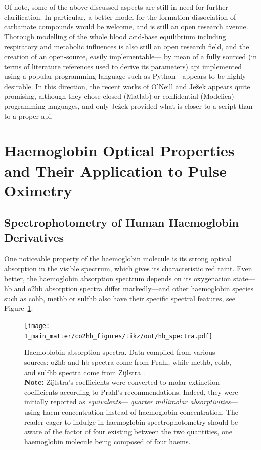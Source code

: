 \mfrin{}Of note, some of the above-discussed aspects are still in need for further clarification. In particular, a better model for the formation-dissociation of carbamate compounds would be welcome, and is still an open research avenue\cite{blake2022}. Thorough modelling of the whole blood acid-base equilibrium including respiratory and metabolic influences is also still an open research field, and the creation of an open-source, easily implementable---\ie{} by mean of a fully sourced (in terms of literature references used to derive its parameters) \gls{api} implemented using a popular programming language such as Python---appears to be highly desirable. In this direction, the recent works of O'Neill and Ježek appears quite promising\cite{oneill2017, jezek2018}, although they chose closed (Matlab) or confidential (Modelica) programming languages, and only Ježek provided what is closer to a script than to a proper \gls{api}.

\section[Hb. Optical Prop. and Their App. to Pulse Oximetry]{Haemoglobin Optical Properties and Their Application to Pulse Oximetry}

\subsection{Spectrophotometry of Human Haemoglobin Derivatives}\label{sect:co2hb:hb_optical_prop}

One noticeable property of the haemoglobin molecule is its strong optical absorption in the visible spectrum, which gives \myblood{} its characteristic red taint. Even better, the haemoglobin absorption spectrum depends on its oxygenation state---\ie{} \gls{hb} and \gls{o2hb} absorption spectra differ markedly---and other haemoglobin species such as \gls{cohb}, \gls{methb} or \gls{sulfhb} also have their specific spectral features, see Figure~\ref{fig:co2hb:hb_spectra}.

\begin{figure}
	\centering
	\texttt{[image: 1\_main\_matter/co2hb\_figures/tikz/out/hb\_spectra.pdf]}
	\caption[Absorption spectra of haemoglobin derivatives from the literature.]{Haemoblobin absorption spectra. Data compiled from various sources: \gls{o2hb} and \gls{hb} spectra come from Prahl\cite{prahl1998}, while \gls{methb}, \gls{cohb}, and \gls{sulfhb} spectra come from Zijlstra \etal{}\cite{zijlstra2000}.\\\textbf{Note:} Zijlstra's coefficients were converted to molar extinction coefficients according to Prahl's recommendations. Indeed, they were initially reported as \emph{equivalents}---\aka{} \emph{quarter millimolar absorptivities}---\ie{} using haem concentration instead of haemoglobin concentration. The reader eager to indulge in haemoglobin spectrophotometry should be aware of the factor of four existing between the two quantities, one haemoglobin molecule being composed of four haems.}
	\label{fig:co2hb:hb_spectra}
\end{figure}


